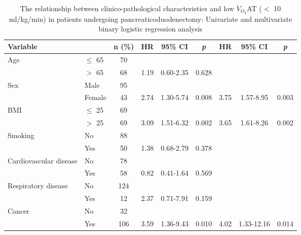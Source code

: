 \begin{sidewaystable}[p]
	\caption{The relationship between clinico-pathological characteristics and low $\dot{V}_{O_2}$AT ($<$ 10 ml/kg/min) in patients undergoing pancreaticoduodenectomy: Univariate and multivariate binary logistic regression analysis}
	\label{table:cpet_oj_at_regression}
	\setlength{\tabcolsep}{9pt} %
	\centering
	\begin{tabular}{|l l c| c c c| c c c|}
		\hline
		Variable                &           & n (\%) & HR   & 95\% CI    & \textit{p} & HR   & 95\% CI    & \textit{p} \\ \hline
		Age                     & $\leq$ 65 & 70     &      &            &            &      &            &  \\
		                        & $>$ 65    & 68     & 1.19 & 0.60-2.35  & 0.628      &      &            &  \\
		Sex                     & Male      & 95     &      &            &            &      &            &  \\
		                        & Female    & 43     & 2.74 & 1.30-5.74  & 0.008      & 3.75 & 1.57-8.95  & 0.003      \\
		BMI                     & $\leq$ 25 & 69     &      &            &            &      &            &  \\
		                        & $>$ 25    & 69     & 3.09 & 1.51-6.32  & 0.002      & 3.65 & 1.61-8.26  & 0.002      \\
		Smoking                 & No        & 88     &      &            &            &      &            &  \\
		                        & Yes       & 50     & 1.38 & 0.68-2.79  & 0.378      &      &            &  \\
		Cardiovascular disease  & No        & 78     &      &            &            &      &            &  \\
		                        & Yes       & 58     & 0.82 & 0.41-1.64  & 0.569      &      &            &  \\
		Respiratory disease     & No        & 124    &      &            &            &      &            &  \\
		                        & Yes       & 12     & 2.37 & 0.71-7.91  & 0.159      &      &            &  \\
		Cancer                  & No        & 32     &      &            &            &      &            &  \\
		                        & Yes       & 106    & 3.59 & 1.36-9.43  & 0.010      & 4.02 & 1.33-12.16 & 0.014      \\

\end{tabular}
\end{sidewaystable}
